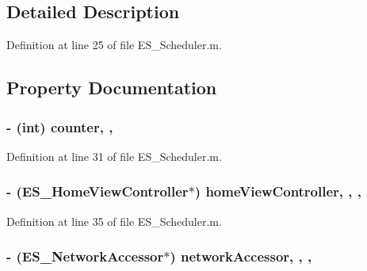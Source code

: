 \subsection{Detailed Description}


Definition at line 25 of file E\+S\+\_\+\+Scheduler.\+m.



\subsection{Property Documentation}
\hypertarget{category_e_s___scheduler_07_08_a2c53e7d223551dba41715efa46826b2b}{
\subsubsection[{counter}]{\setlength{\rightskip}{0pt plus 5cm}-\/ ({\bf int}) counter\hspace{0.3cm}{\ttfamily [read]}, {\ttfamily [write]}, {\ttfamily [atomic]}}}\label{category_e_s___scheduler_07_08_a2c53e7d223551dba41715efa46826b2b}


Definition at line 31 of file E\+S\+\_\+\+Scheduler.\+m.

\hypertarget{category_e_s___scheduler_07_08_a43e8d9d72ef504ba23c073597012ff3f}{
\subsubsection[{home\+View\+Controller}]{\setlength{\rightskip}{0pt plus 5cm}-\/ ({\bf E\+S\+\_\+\+Home\+View\+Controller}$\ast$) home\+View\+Controller\hspace{0.3cm}{\ttfamily [read]}, {\ttfamily [write]}, {\ttfamily [nonatomic]}, {\ttfamily [strong]}}}\label{category_e_s___scheduler_07_08_a43e8d9d72ef504ba23c073597012ff3f}


Definition at line 35 of file E\+S\+\_\+\+Scheduler.\+m.

\hypertarget{category_e_s___scheduler_07_08_a00b193160f77cbff712bc6afa3aba894}{
\subsubsection[{network\+Accessor}]{\setlength{\rightskip}{0pt plus 5cm}-\/ ({\bf E\+S\+\_\+\+Network\+Accessor}$\ast$) network\+Accessor\hspace{0.3cm}{\ttfamily [read]}, {\ttfamily [write]}, {\ttfamily [nonatomic]}, {\ttfamily [strong]}}}\label{category_e_s___scheduler_07_08_a00b193160f77cbff712bc6afa3aba894}


